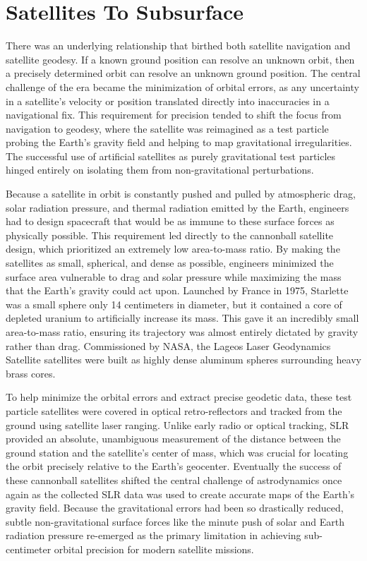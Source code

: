 \section{Satellites To Subsurface}

There was an underlying relationship that birthed both satellite navigation and satellite geodesy. If a known ground position can resolve an unknown orbit, then a precisely determined orbit can resolve an unknown ground position. The central challenge of the era became the minimization of orbital errors, as any uncertainty in a satellite’s velocity or position translated directly into inaccuracies in a navigational fix. This requirement for precision tended to shift the focus from navigation to geodesy, where the satellite was reimagined as a test particle probing the Earth’s gravity field and helping to map gravitational irregularities. The successful use of artificial satellites as purely gravitational test particles hinged entirely on isolating them from non-gravitational perturbations. 

Because a satellite in orbit is constantly pushed and pulled by atmospheric drag, solar radiation pressure, and thermal radiation emitted by the Earth, engineers had to design spacecraft that would be as immune to these surface forces as physically possible. This requirement led directly to the cannonball satellite design, which prioritized an extremely low area-to-mass ratio. By making the satellites as small, spherical, and dense as possible, engineers minimized the surface area vulnerable to drag and solar pressure while maximizing the mass that the Earth's gravity could act upon. Launched by France in 1975, Starlette was a small sphere only 14 centimeters in diameter, but it contained a core of depleted uranium to artificially increase its mass. This gave it an incredibly small area-to-mass ratio, ensuring its trajectory was almost entirely dictated by gravity rather than drag. Commissioned by NASA, the Lageos Laser Geodynamics Satellite satellites were built as highly dense aluminum spheres surrounding heavy brass cores.

To help minimize the orbital errors and extract precise geodetic data, these test particle satellites were covered in optical retro-reflectors and tracked from the ground using satellite laser ranging. Unlike early radio or optical tracking, SLR provided an absolute, unambiguous measurement of the distance between the ground station and the satellite's center of mass, which was crucial for locating the orbit precisely relative to the Earth's geocenter. Eventually the success of these cannonball satellites shifted the central challenge of astrodynamics once again as the collected SLR data was used to create accurate maps of the Earth's gravity field. Because the gravitational errors had been so drastically reduced, subtle non-gravitational surface forces like the minute push of solar and Earth radiation pressure re-emerged as the primary limitation in achieving sub-centimeter orbital precision for modern satellite missions.

